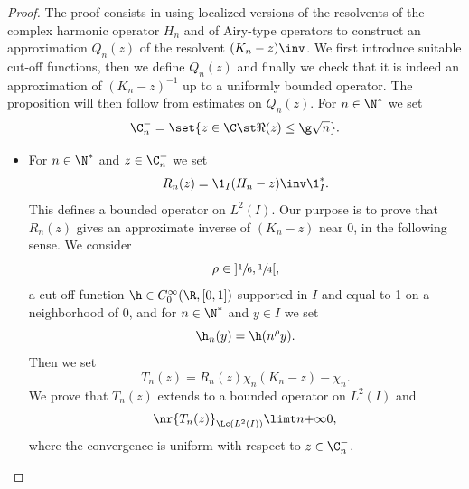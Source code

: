 \begin{proof}
The proof consists in using localized versions of the resolvents of the complex harmonic operator $H_n$ and of Airy-type operators to construct an approximation $Q_n(z)$ of the resolvent $(K_n-z)\inv$. We first introduce suitable cut-off functions, then we define $Q_n(z)$ and finally we check that it is indeed an approximation
of $(K_n -z)^{-1}$ up to a uniformly bounded operator. The proposition will then follow from estimates on $Q_n(z)$.
For $n \in \N^*$ we set
\[
\C_n^- = \set{z \in \C \st \Re(z) \leq \g \sqrt n}.
\]

\begin{itemize}
\item
For $n \in \N^*$ and $z \in \C_n^-$ we set
\[
R_n(z) = \1_I (H_n-z)\inv \1_I^*.
\]
This defines a bounded operator on $L^2(I)$. Our purpose is to prove that $R_n(z)$ gives an approximate inverse of $(K_n-z)$ near 0, in the following sense. We consider
\[
\rho \in{}]\sfrac 16,\sfrac 14[,
\]
a cut-off function $\h \in C_0^\infty(\R,[0,1])$ supported in $I$ and equal to 1 on a neighborhood of 0, and for $n \in \N^*$ and $y \in \bar I$ we set
\[
\h_n(y) = \h(n^\rho y).
\]
Then we set
\[
T_n(z) = R_n(z) \chi_n (K_n-z) - \chi_n.
\]
We prove that $T_n(z)$ extends to a bounded operator on $L^2(I)$ and
\begin{equation} \label{estim-res-Rn}
\nr{T_n(z)}_{\Lc(L^2(I))} \limt n {+\infty} 0,
\end{equation}
where the convergence is uniform with respect to $z \in \C_n^-$.


\end{itemize}
\end{proof}

